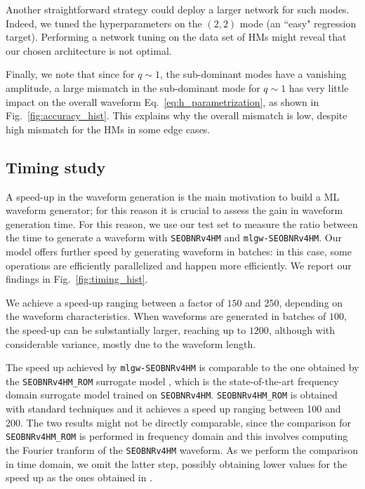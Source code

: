 \documentclass[twocolumn,showpacs,preprintnumbers,nofootinbib,prd,
superscriptaddress,10pt]{revtex4-2}
\begin{document}
Another straightforward strategy could deploy a larger network for such modes. Indeed, we tuned the hyperparameters on the $(2,2)$ mode (an ``easy" regression target). Performing a network tuning on the data set of HMs might reveal that our chosen architecture is not optimal.

Finally, we note that since for $q\sim 1$, the sub-dominant modes have a vanishing amplitude, a large mismatch in the 
sub-dominant mode for $q\sim 1$ has very little impact on the overall waveform Eq.~\eqref{eq:h_parametrization}, 
as shown in Fig.~\ref{fig:accuracy_hist}.
This explains why the overall mismatch is low, despite high mismatch for the HMs in some edge cases.

\subsection{Timing study}
\label{sec:timing}

A speed-up in the waveform generation is the main motivation to build a ML waveform generator; for this reason it is crucial to assess the gain in waveform generation time.
For this reason, we use our test set to measure the ratio between the time to generate a waveform with \texttt{SEOBNRv4HM} and \texttt{mlgw-SEOBNRv4HM}. Our model offers further speed by generating waveform in batches: in this case, some operations are efficiently parallelized and happen more efficiently.
We report our findings in Fig.~\ref{fig:timing_hist}.

We achieve a speed-up ranging between a factor of $150$ and $250$, depending on the waveform characteristics. When waveforms are generated in batches of $100$, the speed-up can be substantially larger, reaching up to $1200$, although with considerable variance, mostly due to the waveform length.

The speed up achieved by \texttt{mlgw-SEOBNRv4HM} is comparable to the one obtained by the \texttt{SEOBNRv4HM\_ROM} surrogate model \cite{Cotesta:2020qhw}, which is the state-of-the-art frequency domain surrogate model trained on \texttt{SEOBNRv4HM}. \texttt{SEOBNRv4HM\_ROM} is obtained with standard techniques and it achieves a speed up ranging between 100 and 200.
The two results might not be directly comparable, since the comparison for \texttt{SEOBNRv4HM\_ROM} is performed in frequency domain and this involves computing the Fourier tranform of the \texttt{SEOBNRv4HM} waveform. As we perform the comparison in time domain, we omit the latter step, possibly obtaining lower values for the speed up as the ones obtained in \cite{Cotesta:2020qhw}. 
\end{document}
